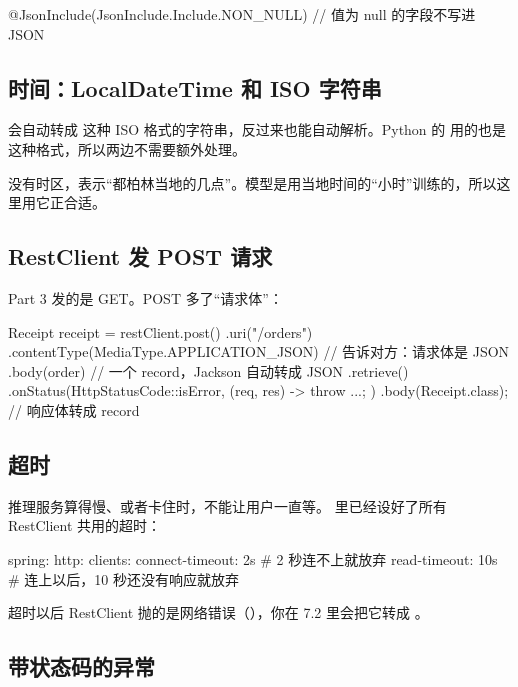 \begin{java}
@JsonInclude(JsonInclude.Include.NON_NULL)     // 值为 null 的字段不写进 JSON
\end{java}

\subsection{时间：LocalDateTime 和 ISO 字符串}

 会自动转成  这种 ISO 格式的字符串，反过来也能自动解析。Python 的  用的也是这种格式，所以两边不需要额外处理。

 没有时区，表示“都柏林当地的几点”。模型是用当地时间的“小时”训练的，所以这里用它正合适。

\subsection{RestClient 发 POST 请求}

Part 3 发的是 GET。POST 多了“请求体”：

\begin{java}
Receipt receipt = restClient.post()
        .uri("/orders")
        .contentType(MediaType.APPLICATION_JSON)    // 告诉对方：请求体是 JSON
        .body(order)                                // 一个 record，Jackson 自动转成 JSON
        .retrieve()
        .onStatus(HttpStatusCode::isError, (req, res) -> { throw ...; })
        .body(Receipt.class);                       // 响应体转成 record
\end{java}

\subsection{超时}

推理服务算得慢、或者卡住时，不能让用户一直等。 里已经设好了所有 RestClient 共用的超时：

\begin{yamlcode}
spring:
  http:
    clients:
      connect-timeout: 2s     # 2 秒连不上就放弃
      read-timeout: 10s       # 连上以后，10 秒还没有响应就放弃
\end{yamlcode}

超时以后 RestClient 抛的是网络错误（），你在 7.2 里会把它转成 。

\subsection{带状态码的异常}

